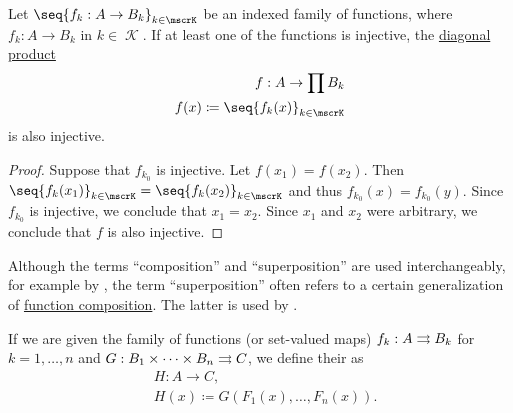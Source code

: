 \begin{lemma}\label{thm:diagonal_product_injectivity}
  Let \( \seq{ f_k: A \to B_k }_{k \in \mscrK} \) be an indexed family of functions, where \( f_k: A \to B_k \) in \( k \in \mscrK \). If at least one of the functions is injective, the \hyperref[def:topological_product]{diagonal product}
  \begin{equation*}
    \begin{aligned}
      f: A \to \prod B_k \\
      f(x) \coloneqq \seq{ f_k(x) }_{k \in \mscrK}
    \end{aligned}
  \end{equation*}
  is also injective.
\end{lemma}
\begin{proof}
  Suppose that \( f_{k_0} \) is injective. Let \( f(x_1) = f(x_2) \). Then \( \seq{ f_k(x_1) }_{k \in \mscrK} = \seq{ f_k(x_2) }_{k \in \mscrK} \) and thus \( f_{k_0}(x) = f_{k_0}(y) \). Since \( f_{k_0} \) is injective, we conclude that \( x_1 = x_2 \). Since \( x_1 \) and \( x_2 \) were arbitrary, we conclude that \( f \) is also injective.
\end{proof}

\begin{remark}\label{rem:function_superposition}
  Although the terms \enquote{composition} and \enquote{superposition} are used interchangeably, for example by , the term \enquote{superposition} often refers to a certain generalization of \hyperref[def:set_valued_map/composition]{function composition}. The latter is used by .

  If we are given the family of functions (or set-valued maps) \( f_k: A \rightrightarrows B_k \) for \( k = 1, \ldots, n \) and \( G: B_1 \times \cdots \times B_n \rightrightarrows C \), we define their  as
  \begin{equation*}
    \begin{aligned}
      &H: A \to C, \\
      &H(x) \coloneqq G(F_1(x), \ldots, F_n(x)).
    \end{aligned}
  \end{equation*}
\end{remark}

